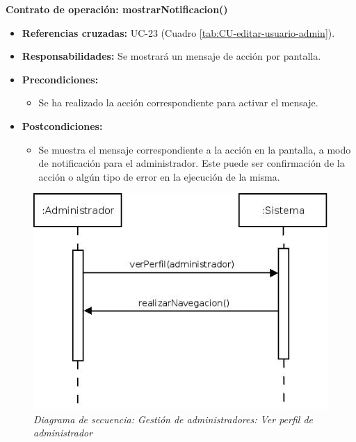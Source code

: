 \textbf{Contrato de operación: mostrarNotificacion()}
\begin{itemize}
\item \textbf{Referencias cruzadas:} UC-23 (Cuadro \ref{tab:CU-editar-usuario-admin}).
\item \textbf{Responsabilidades:} Se mostrará un mensaje de acción por pantalla.
\item \textbf{Precondiciones:} 
 \begin{itemize}
\item Se ha realizado la acción correspondiente para activar el mensaje.
\end {itemize}
\item \textbf{Postcondiciones:} 
 \begin{itemize}
\item Se muestra el mensaje correspondiente a la acción en la pantalla, a modo de notificación para el administrador. Este puede ser confirmación de la acción o algún tipo de error en la ejecución de la misma.
\end {itemize}
\end {itemize}


\vspace{10mm}

\begin{figure}[H]
\centering
  \includegraphics[scale=.55]{img/secuencias/gestion-administradores-ver-perfil.jpeg}
  \caption{\textit{Diagrama de secuencia: Gestión de administradores: Ver perfil de administrador}}
  \label{fig:secuencia-gestion-administradores-ver-perfil}
\end{figure}

